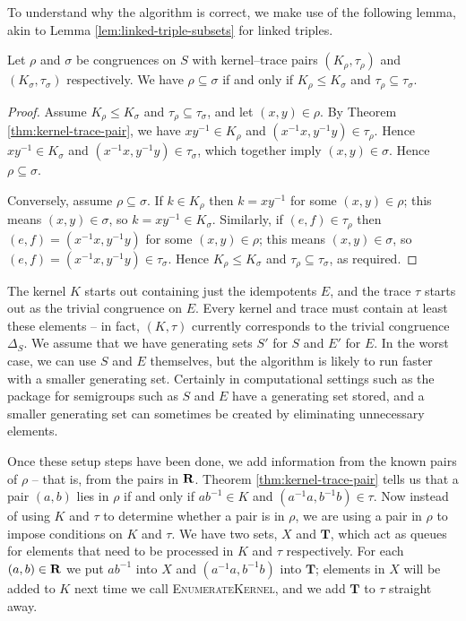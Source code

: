 To understand why the algorithm is correct, we make use of the following lemma,
akin to Lemma \ref{lem:linked-triple-subsets} for linked triples.

\begin{lemma}
  \label{lem:kertr-subsets}
  Let $\rho$ and $\sigma$ be congruences on $S$ with kernel--trace pairs
  $(K_\rho, \tau_\rho)$ and $(K_\sigma, \tau_\sigma)$ respectively.  We have
  $\rho \subseteq \sigma$ if and only if $K_\rho \leq K_\sigma$ and
  $\tau_\rho \subseteq \tau_\sigma$.
  \begin{proof}
    Assume $K_\rho \leq K_\sigma$ and $\tau_\rho \subseteq \tau_\sigma$, and let
    $(x,y) \in \rho$.  By Theorem \ref{thm:kernel-trace-pair}, we have
    $xy^{-1} \in K_\rho$ and $(x^{-1}x, y^{-1}y) \in \tau_\rho$.  Hence
    $xy^{-1} \in K_\sigma$ and $(x^{-1}x, y^{-1}y) \in \tau_\sigma$, which
    together imply $(x,y) \in \sigma$.  Hence $\rho \subseteq \sigma$.

    Conversely, assume $\rho \subseteq \sigma$.  If $k \in K_\rho$ then
    $k=xy^{-1}$ for some $(x,y) \in \rho$; this means $(x,y) \in \sigma$, so
    $k=xy^{-1} \in K_\sigma$.  Similarly, if $(e,f) \in \tau_\rho$ then
    $(e,f) = (x^{-1}x, y^{-1}y)$ for some $(x,y) \in \rho$; this means
    $(x,y) \in \sigma$, so $(e,f) = (x^{-1}x, y^{-1}y) \in \tau_\sigma$.  Hence
    $K_\rho \leq K_\sigma$ and $\tau_\rho \subseteq \tau_\sigma$, as
    required.
  \end{proof}
\end{lemma}

The kernel $K$ starts out containing just the idempotents $E$, and the trace
$\tau$ starts out as the trivial congruence on $E$.  Every kernel and trace must
contain at least these elements -- in fact, $(K, \tau)$ currently corresponds to
the trivial congruence $\Delta_S$.  We assume that we have generating sets $S'$
for $S$ and $E'$ for $E$.  In the worst case, we can use $S$ and $E$ themselves,
but the algorithm is likely to run faster with a smaller generating set.
Certainly in computational settings such as the \Semigroups{} package for \GAP{}
\cite{semigroups} semigroups such as $S$ and $E$ have a generating set stored,
and a smaller generating set can sometimes be created by eliminating unnecessary
elements.

Once these setup steps have been done, we add information from the known pairs
of $\rho$ -- that is, from the pairs in $\mathbf{R}$.  Theorem
\ref{thm:kernel-trace-pair} tells us that a pair $(a,b)$ lies in $\rho$ if and
only if $ab^{-1} \in K$ and $(a^{-1}a, b^{-1}b) \in \tau$.  Now instead of using
$K$ and $\tau$ to determine whether a pair is in $\rho$, we are using a pair in
$\rho$ to impose conditions on $K$ and $\tau$.  We have two sets, $X$ and
$\mathbf{T}$, which act as queues for elements that need to be processed in $K$
and $\tau$ respectively.  For each $(a,b) \in \mathbf{R}$ we put $ab^{-1}$ into
$X$ and $(a^{-1}a, b^{-1}b)$ into $\mathbf{T}$; elements in $X$ will be added
to $K$ next time we call \textsc{EnumerateKernel}, and we add $\mathbf{T}$ to
$\tau$ straight away.

